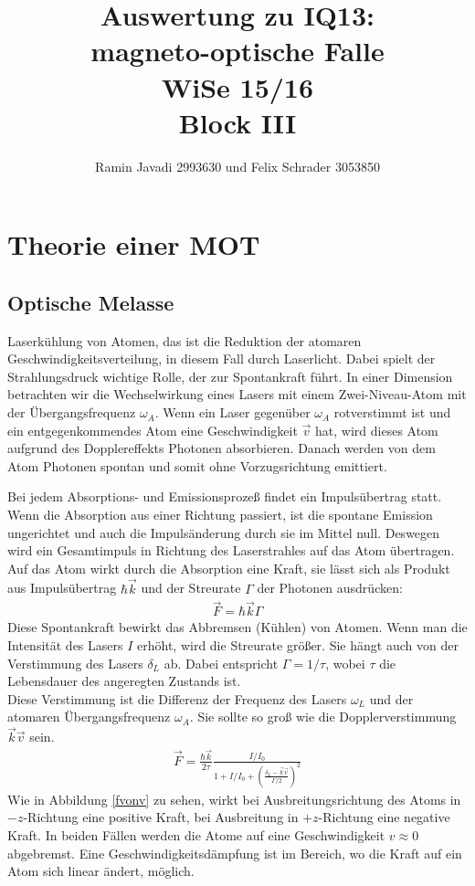 \documentclass[12pt,a4paper]{article}
\title{Auswertung zu IQ13:\\
       magneto-optische Falle\\
       WiSe 15/16\\
       Block III}
\author{Ramin Javadi 2993630 und Felix Schrader 3053850}
\date{}
\begin{document}
\maketitle
\tableofcontents
\pagebreak
\section{Theorie einer MOT}
  \subsection{Optische Melasse}
  
  Laserkühlung von Atomen, das ist die Reduktion der atomaren Geschwindigkeitsverteilung, in diesem Fall durch Laserlicht. Dabei spielt der Strahlungsdruck wichtige Rolle, der zur Spontankraft führt. In einer Dimension betrachten wir die Wechselwirkung eines Lasers mit einem Zwei-Niveau-Atom mit der Übergangsfrequenz ${\omega_A}$. Wenn ein Laser gegenüber ${\omega_A}$ rotverstimmt ist und ein entgegenkommendes Atom eine Geschwindigkeit ${\vec v}$ hat, wird dieses Atom aufgrund des Dopplereffekts Photonen absorbieren. Danach werden von dem Atom Photonen spontan und somit ohne Vorzugsrichtung emittiert.
  
  Bei jedem Absorptions- und Emissionsprozeß findet ein Impulsübertrag statt. Wenn die Absorption aus einer Richtung passiert, ist die spontane Emission ungerichtet und auch die Impulsänderung durch sie im Mittel null. Deswegen wird ein Gesamtimpuls in Richtung des Laserstrahles auf das Atom übertragen.
 \\Auf das Atom wirkt durch die Absorption eine Kraft, sie lässt sich als Produkt aus Impulsübertrag $\hbar\vec{k}$ und der Streurate $\Gamma$ der Photonen ausdrücken: 
   \begin{align*}
  \vec F=\hbar \vec k \Gamma
  \end{align*}
  Diese Spontankraft bewirkt das Abbremsen (Kühlen) von Atomen. Wenn man die Intensität des Lasers ${I}$ erhöht, wird die Streurate größer. Sie hängt auch von der Verstimmung des Lasers ${\delta_L}$ ab. Dabei entspricht ${\Gamma =1/ \tau}$, wobei ${\tau}$ die Lebensdauer des angeregten Zustands ist.
  \\Diese Verstimmung ist die Differenz der Frequenz des Lasers ${\omega_L}$ und der atomaren Übergangsfrequenz ${\omega_A}$. Sie sollte so groß wie die Dopplerverstimmung ${\vec k \vec v}$ sein.
   \begin{align*}
    \vec F=\frac{\hbar \vec k}{2 \tau} \frac{I/I_0}{1+I/I_0+(\frac{ \delta _L-\vec k \vec v}{\Gamma /2})^2}
  \end{align*}
  Wie in Abbildung \ref{fvonv} zu sehen, wirkt bei Ausbreitungsrichtung des Atoms in $-z$-Richtung eine positive Kraft, bei Ausbreitung in $+z$-Richtung eine negative Kraft. In beiden Fällen werden die Atome auf eine Geschwindigkeit ${v\approx 0}$ abgebremst. Eine Geschwindigkeitsdämpfung ist im Bereich, wo die Kraft auf ein Atom sich linear ändert, möglich.
  
\end{document}
